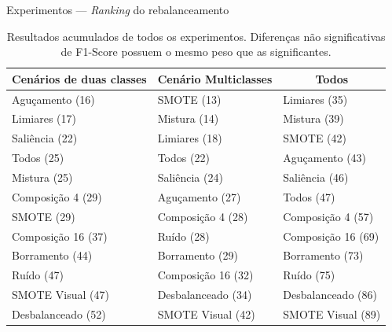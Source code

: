 \documentclass[10pt]{beamer}
\begin{document}
\begin{frame}{Experimentos --- \textit{Ranking} do rebalanceamento}
  \setlength\leftmargini{1em}
  \begin{table}
    \centering
    \caption{Resultados acumulados de todos os experimentos. Diferenças não significativas de F1-Score possuem o mesmo peso que as significantes.}
    \footnotesize{
    \begin{tabular}{|l|l|l|}
      \hline
      \multicolumn{1}{|c|}{\textbf{Cenários de duas classes}} & \multicolumn{1}{c|}{\textbf{Cenário Multiclasses}} & \multicolumn{1}{c|}{\textbf{Todos}} \\ \hline
      Aguçamento (16)       & SMOTE (13)          & Limiares (35)                       \\ \hline
      Limiares (17)         & Mistura (14)        & Mistura (39)                        \\ \hline
      Saliência (22)        & Limiares (18)       & SMOTE (42)                          \\ \hline
      Todos (25)            & Todos (22)          & Aguçamento (43)                     \\ \hline
      Mistura (25)          & Saliência (24)      & Saliência (46)                      \\ \hline
      Composição 4 (29)     & Aguçamento (27)     & Todos (47)                          \\ \hline
      SMOTE (29)            & Composição 4 (28)   & Composição 4 (57)                   \\ \hline
      Composição 16 (37)    & Ruído (28)          & Composição 16 (69)                  \\ \hline
      Borramento (44)       & Borramento (29)     & Borramento (73)                     \\ \hline
      Ruído (47)            & Composição 16 (32)  & Ruído (75)                          \\ \hline
      SMOTE Visual (47)     & Desbalanceado (34)  & Desbalanceado (86)                  \\ \hline
      Desbalanceado (52)    & SMOTE Visual (42)   & SMOTE Visual (89)                   \\ \hline
    \end{tabular}
    }
  \end{table}
\end{frame}
\end{document}
